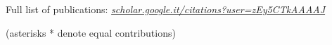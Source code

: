 


Full list of publications: 
\emph{\href{https://scholar.google.it/citations?user=zEy5CTkAAAAJ\&hl=en}{scholar.google.it/citations?user=zEy5CTkAAAAJ}}
\\\begin{footnotesize}(asterisks * denote equal contributions)\end{footnotesize}

